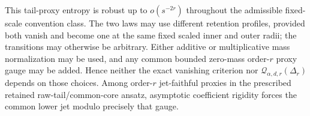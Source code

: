 This tail-proxy entropy is robust up to \(o(s^{-2r})\) throughout the
admissible fixed-scale convention class.  The two laws may use different
retention profiles, provided both vanish and become one at the same fixed
scaled inner and outer radii; the transitions may otherwise be arbitrary.
Either additive or multiplicative mass normalization may be used, and any
common bounded zero-mass order-\(r\) proxy gauge may be added.  Hence neither
the exact vanishing criterion nor \(\mathcal Q_{\alpha,d,r}(\Delta_r)\)
depends on those choices.  Among order-\(r\) jet-faithful proxies in the
prescribed retained raw-tail/common-core ansatz, asymptotic coefficient
rigidity forces the common lower jet modulo precisely that gauge.
